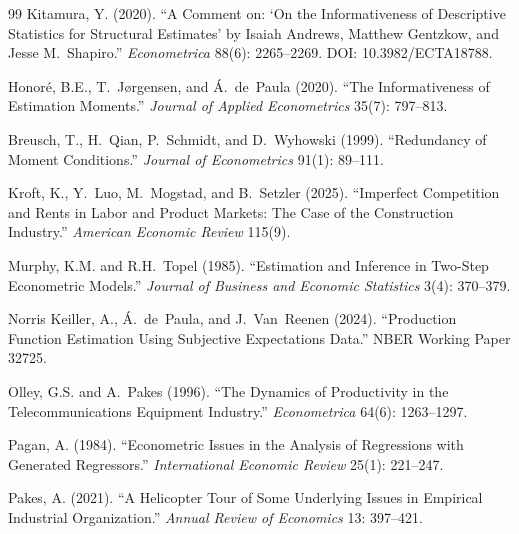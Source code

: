 \documentclass[11pt]{article}
\begin{document}
\begin{thebibliography}{99}
Kitamura, Y. (2020).
``A Comment on: `On the Informativeness of Descriptive Statistics for Structural Estimates' by Isaiah Andrews, Matthew Gentzkow, and Jesse M.\ Shapiro.''
\emph{Econometrica} 88(6): 2265--2269. DOI: 10.3982/ECTA18788.

Honor\'e, B.E., T.\ J\o rgensen, and \'A.\ de~Paula (2020).
``The Informativeness of Estimation Moments.''
\emph{Journal of Applied Econometrics} 35(7): 797--813.

Breusch, T., H.\ Qian, P.\ Schmidt, and D.\ Wyhowski (1999).
``Redundancy of Moment Conditions.''
\emph{Journal of Econometrics} 91(1): 89--111.

Kroft, K., Y.~Luo, M.~Mogstad, and B.~Setzler (2025).
``Imperfect Competition and Rents in Labor and Product Markets: The Case of the Construction Industry.''
\emph{American Economic Review} 115(9).

Murphy, K.M. and R.H.~Topel (1985).
``Estimation and Inference in Two-Step Econometric Models.''
\emph{Journal of Business and Economic Statistics} 3(4): 370--379.

Norris Keiller, A., \'A.~de~Paula, and J.~Van~Reenen (2024).
``Production Function Estimation Using Subjective Expectations Data.''
NBER Working Paper 32725.

Olley, G.S. and A.~Pakes (1996).
``The Dynamics of Productivity in the Telecommunications Equipment Industry.''
\emph{Econometrica} 64(6): 1263--1297.

Pagan, A. (1984).
``Econometric Issues in the Analysis of Regressions with Generated Regressors.''
\emph{International Economic Review} 25(1): 221--247.

Pakes, A. (2021).
``A Helicopter Tour of Some Underlying Issues in Empirical Industrial Organization.''
\emph{Annual Review of Economics} 13: 397--421.

\end{thebibliography}
\end{document}
